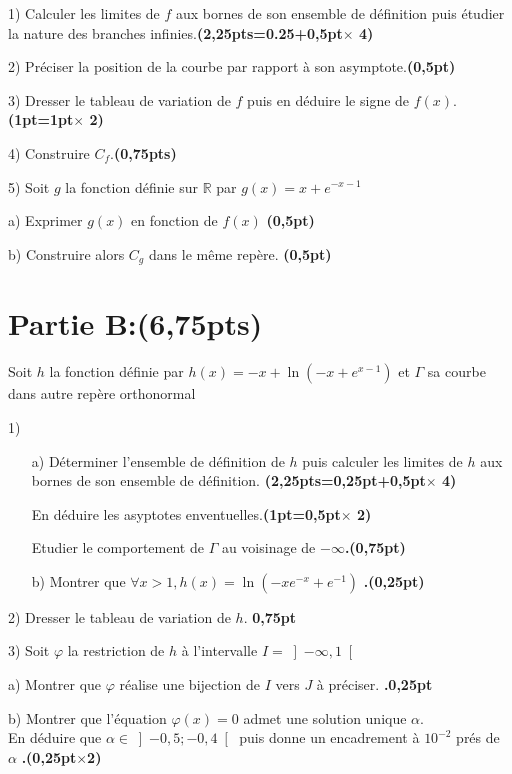 \documentclass[12pt]{article}
\begin{document}
1) Calculer les limites de $f$ aux bornes de son ensemble de définition puis étudier la nature des branches infinies.\textbf{(2,25pts=0.25+0,5pt$\times$ 4)}

2) Préciser la position de la courbe par rapport à son asymptote.\textbf{(0,5pt)}

3) Dresser le tableau de variation de $f$ puis en déduire le signe de $f(x)$.\textbf{(1pt=1pt$\times$ 2)}

4) Construire $C_{f}$.\textbf{(0,75pts)}

5) Soit $g$ la fonction définie sur $\mathbb{R}$ par $g(x)=x+e^{-x-1}$

  a) Exprimer $g(x)$ en fonction de $f(x)$ \textbf{(0,5pt)}
  
  b) Construire alors $C_{g}$ dans le même repère.  \textbf{(0,5pt)}
\section*{Partie B:(6,75pts)}
Soit $h$ la fonction définie par $h(x)=-x+\ln(-x+e^{x-1})$  et $\Gamma$ sa courbe dans autre repère orthonormal

1)
\begin{itemize}
	\item[a)] Déterminer l’ensemble de définition de $h$ puis calculer les limites de $h$ aux bornes de son ensemble de définition. \textbf{(2,25pts=0,25pt+0,5pt$\times$ 4)}
	\item[] En déduire les asyptotes enventuelles.\textbf{(1pt=0,5pt$\times$ 2)}
	\item[]Etudier le comportement de  $\Gamma$ au voisinage de $-\infty$\textbf{.(0,75pt)}

	\item[b)]Montrer que $\forall x>1, h(x)=\ln(-xe^{-x}+e^{-1}) $ \textbf{.(0,25pt)}
\end{itemize}
2) Dresser le tableau de variation de  $h$.   \textbf{0,75pt}
    
3) Soit $\varphi$ la restriction de $h$ à l’intervalle $I=\left]-\infty, 1\right[ $
    
    a) Montrer que $\varphi$  réalise une bijection de $I$ vers $J$  à préciser.
    \textbf{.0,25pt}
        
    b) Montrer que l’équation $\varphi(x)=0$ admet une solution unique $\alpha$.\\
    En déduire que $\alpha \in \left]-0,5 ; -0,4 \right[ $ puis donne un encadrement à $10^{-2}$ prés de $\alpha$ \textbf{.(0,25pt$\times$2)}
    
\end{document}
